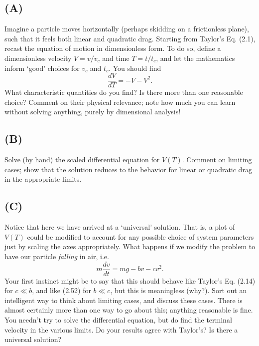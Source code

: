 \documentclass{article}
\numberwithin{equation}{section}
\begin{document}
\subsection*{(A)} 
Imagine a particle moves horizontally (perhaps skidding on a frictionless plane), such that it feels both linear and quadratic drag. Starting from Taylor’s Eq. (2.1), recast the equation of motion in dimensionless form. To do so, define a dimensionless velocity \( V = v/v_c \) and time \( T = t/t_c \), and let the mathematics inform ‘good’ choices for \( v_c \) and \( t_c \). You should find
\[
\frac{dV}{dT} = -V - V^2.
\]
What characteristic quantities do you find? Is there more than one reasonable choice? Comment on their physical relevance; note how much you can learn without solving anything, purely by dimensional analysis!

\subsection*{(B)} 
Solve (by hand) the scaled differential equation for \( V(T) \). Comment on limiting cases; show that the solution reduces to the behavior for linear or quadratic drag in the appropriate limits.

\subsection*{(C)} 
Notice that here we have arrived at a ‘universal’ solution. That is, a plot of \( V(T) \) could be modified to account for any possible choice of system parameters just by scaling the axes appropriately. What happens if we modify the problem to have our particle \textit{falling} in air, i.e.
\[
m \frac{dv}{dt} = mg - bv - cv^2.
\]
Your first instinct might be to say that this should behave like Taylor’s Eq. (2.14) for \( c \ll b \), and like (2.52) for \( b \ll c \), but this is meaningless (why?). Sort out an intelligent way to think about limiting cases, and discuss these cases. There is almost certainly more than one way to go about this; anything reasonable is fine. You needn’t try to solve the differential equation, but do find the terminal velocity in the various limits. Do your results agree with Taylor’s? Is there a universal solution?
\end{document}
